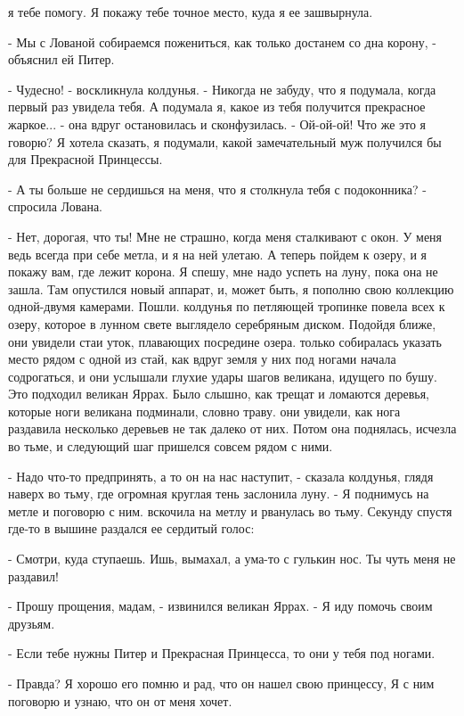 я тебе помогу. Я покажу тебе точное место, куда я ее зашвырнула.
\par- Мы с Лованой собираемся пожениться, как только достанем со дна 
корону, - объяснил ей Питер.
\par- Чудесно! - воскликнула колдунья. - Никогда не забуду, что я 
подумала, когда первый раз увидела тебя. А подумала я, какое из тебя 
получится прекрасное жаркое... - она вдруг остановилась и 
сконфузилась. - Ой-ой-ой! Что же это я говорю? Я хотела сказать, я 
подумали, какой замечательный муж получился бы для Прекрасной 
Принцессы.
\par- А ты больше не сердишься на меня, что я столкнула тебя с 
подоконника? - спросила Лована.
\par- Нет, дорогая, что ты! Мне не страшно, когда меня сталкивают с 
окон. У меня ведь всегда при себе метла, и я на ней улетаю. А теперь 
пойдем к озеру, и я покажу вам, где лежит корона. Я спешу, мне надо 
успеть на луну, пока она не зашла. Там опустился новый аппарат, и, 
может быть, я пополню свою коллекцию одной-двумя камерами. Пошли.
 колдунья по петляющей тропинке повела всех к озеру, которое в 
лунном свете выглядело серебряным диском. Подойдя ближе, они увидели 
стаи уток, плавающих посредине озера.
 только собиралась указать место рядом с одной из стай, 
как вдруг земля у них под ногами начала содрогаться, и они услышали 
глухие удары шагов великана, идущего по бушу. Это подходил великан 
Яррах. Было слышно, как трещат и ломаются деревья, которые ноги 
великана подминали, словно траву.
 они увидели, как нога раздавила несколько деревьев не так 
далеко от них. Потом она поднялась, исчезла во тьме, и следующий шаг 
пришелся совсем рядом с ними.
\par- Надо что-то предпринять, а то он на нас наступит, - сказала 
колдунья, глядя наверх во тьму, где огромная круглая тень заслонила 
луну. - Я поднимусь на метле и поговорю с ним.
 вскочила на метлу и рванулась во тьму. Секунду спустя где-то в 
вышине раздался ее сердитый голос:
\par- Смотри, куда ступаешь. Ишь, вымахал, а ума-то с гулькин нос. Ты 
чуть меня не раздавил!
\par- Прошу прощения, мадам, - извинился великан Яррах. - Я иду помочь 
своим друзьям.
\par- Если тебе нужны Питер и Прекрасная Принцесса, то они у тебя под 
ногами.
\par- Правда? Я хорошо его помню и рад, что он нашел свою принцессу, Я 
с ним поговорю и узнаю, что он от меня хочет.
